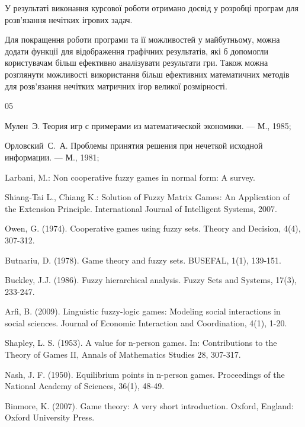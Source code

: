 \documentclass[14pt, a4paper, oneside]{extarticle}
\numberwithin{equation}{section}
\begin{document}
У результаті виконання курсової роботи отримано досвід у розробці програм для розв'язання нечітких ігрових задач. 

Для покращення роботи програми та її можливостей у майбутньому, можна додати функції для відображення графічних результатів, які б допомогли користувачам більш ефективно аналізувати результати гри. Також можна розглянути можливості використання більш ефективних математичних методів для розв'язання нечітких матричних ігор великої розмірності.

\clearpage
\begin{thebibliography}{05}
{\small

 Мулен~Э. Теория игр с примерами из математической экономики. — М., 1985;

 Орловский~С.~А. Проблемы принятия решения при нечеткой исходной информации. — М., 1981;

 Larbani, M.: Non cooperative fuzzy games in normal form: A survey.

 Shiang-Tai L., Chiang K.: Solution of Fuzzy Matrix Games: An Application of the Extension Principle. International Journal of Intelligent Systems, 2007.

 Owen, G. (1974). Cooperative games using fuzzy sets. Theory and Decision, 4(4), 307-312.

 Butnariu, D. (1978). Game theory and fuzzy sets. BUSEFAL, 1(1), 139-151.

 Buckley, J.J. (1986). Fuzzy hierarchical analysis. Fuzzy Sets and Systems, 17(3), 233-247.

 Arfi, B. (2009). Linguistic fuzzy-logic games: Modeling social interactions in social sciences. Journal of Economic Interaction and Coordination, 4(1), 1-20.

 Shapley, L. S. (1953). A value for n-person games. In: Contributions to the Theory of Games II, Annals of Mathematics Studies 28, 307-317.

 Nash, J. F. (1950). Equilibrium points in n-person games. Proceedings of the National Academy of Sciences, 36(1), 48-49.

 Binmore, K. (2007). Game theory: A very short introduction. Oxford, England: Oxford University Press.


}
\end{thebibliography}
\end{document}
